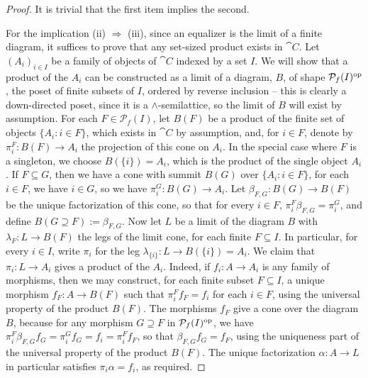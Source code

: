 \begin{proof}
It is trivial that the first item implies the second. 

For the implication (ii)
$\Rightarrow$ (iii), since an equalizer is the limit of a finite diagram, it
suffices to prove that any set-sized product exists in $\cat{C}$. Let $(A_i)_{i
\in I}$ be a family of objects of $\cat{C}$ indexed by a set $I$. We will show
that a product of the $A_i$ can be constructed as a limit of a diagram, $B$, of
shape $\mathcal{P}_f(I)^{\mathrm{op}}$, the poset of finite subsets of $I$, ordered by
reverse inclusion -- this is clearly a down-directed poset, since it is a
$\wedge$-semilattice, so the limit of $B$ will exist by assumption. For each $F
\in \mathcal{P}_f(I)$, let $B(F)$ be a product of the finite set of objects
$\{A_i \colon i \in F\}$, which exists in $\cat{C}$ by assumption, and, for $i
\in F$, denote by $\pi^F_i \colon B(F) \to A_i$ the projection of this cone on
$A_i$. In the special case where $F$ is a singleton, we choose $B(\{i\}) = A_i$, which is the product of the single object $A_i$. 
If $F \subseteq G$, then we have a cone with summit $B(G)$ over $\{A_i
\colon i \in F\}$, for each $i \in F$, we have $i \in G$, so we have $\pi^G_i
\colon B(G) \to A_i$. Let $\beta_{F,G} \colon B(G) \to B(F)$ be the unique
factorization of this cone, so that for every $i \in F$, $\pi^F_i \beta_{F,G} =
\pi^G_i$, and define $B(G \supseteq F) := \beta_{F,G}$. Now let $L$ be a limit
of the diagram $B$ with $\lambda_F \colon L \to B(F)$ the legs of the limit
cone, for each finite $F \subseteq I$. In particular, for every $i \in I$, write
$\pi_i$ for the leg $\lambda_{\{i\}} \colon L \to B(\{i\}) = A_i$. We claim that
$\pi_i \colon L \to A_i$ gives a product of the $A_i$. Indeed, if $f_i \colon A
\to A_i$ is any family of morphisms, then we may construct, for each finite
subset $F \subseteq I$, a unique morphism $f_F \colon A \to B(F)$ such that
$\pi^F_i f_F = f_i$ for each $i \in F$, using the universal property of the
product $B(F)$. The morphisms $f_F$ give a cone over the diagram $B$, because
for any morphism $G \supseteq F$ in $\mathcal{P}_f(I)^{\mathrm{op}}$, we have $\pi^F_i
\beta_{F,G} f_G = \pi^G_i f_G = f_i = \pi^F_i f_F$, so that $\beta_{F,G} f_G =
f_F$, using the uniqueness part of the universal property of the product $B(F)$.
The unique factorization $\alpha \colon A \to L$ in particular satisfies $\pi_i
\alpha = f_i$, as required.


\end{proof}
